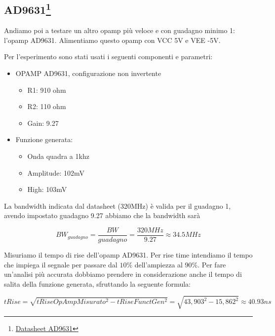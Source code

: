 \newpage
\subsection*{AD9631\footnote{\href{https://www.analog.com/media/en/technical-documentation/data-sheets/AD9631_9632.pdf}{Datasheet AD9631}}}

Andiamo poi a testare un altro opamp più veloce e con guadagno minimo 1: l'opamp AD9631. Alimentiamo questo opamp con VCC 5V e VEE -5V.

Per l'esperimento sono stati usati i seguenti componenti e parametri:

\begin{itemize}
    \item OPAMP AD9631, configurazione non invertente
    \begin{itemize}
        \item R1: 910 ohm
        \item R2: 110 ohm
        \item Gain: 9.27
    \end{itemize}
    
    \item Funzione generata:
    \begin{itemize}
        \item Onda quadra a 1khz
        \item Amplitude: 102mV
        \item High: 103mV
    \end{itemize}
    
\end{itemize}

La bandwidth indicata dal datasheet (320MHz) è valida per il guadagno 1, avendo impostato guadagno 9.27 abbiamo che la bandwidth sarà

\begin{displaymath}
BW_{guadagno} = \frac{BW}{guadagno} = \frac{320 \si{MHz}}{9.27} \approx 34.5 \si{MHz}
\end{displaymath}

Misuriamo il tempo di rise dell'opamp AD9631. Per rise time intendiamo il tempo che impiega il segnale per passare dal $10\%$ dell'ampiezza al $90\%$.
Per fare un'analisi più accurata dobbiamo prendere in considerazione anche il tempo di salita della funzione generata, sfruttando la seguente formula:

\begin{displaymath}
 tRise = \sqrt{tRiseOpAmpMisurato^2 - tRiseFunctGen^2} = \sqrt{43,903^2 - 15,862^2} \approx 40.93 \si{ns}
\end{displaymath}


